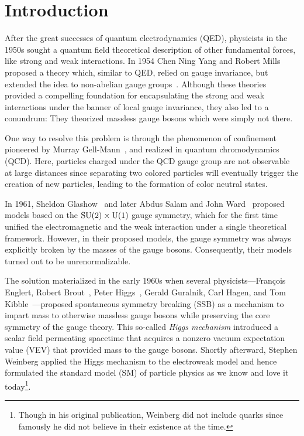 
\chapter{Introduction}\label{chap:one}

After the great successes of quantum electrodynamics (\acs{QED}), physicists in the 1950s sought a quantum field theoretical description of other fundamental forces, like strong and weak interactions. In 1954 Chen Ning Yang and Robert Mills proposed a theory which, similar to \acs{QED}, relied on gauge invariance, but extended the idea to non-abelian gauge groups~\cite{Yang:1954ek}. Although these theories provided a compelling foundation for encapsulating the strong and weak interactions under the banner of local gauge invariance, they also led to a conundrum: They theorized massless gauge bosons which were simply not there.

One way to resolve this problem is through the phenomenon of confinement pioneered by Murray Gell-Mann~\cite{Gell-Mann:1961omu}, and realized in quantum chromodynamics (\acs{QCD}). Here, particles charged under the \acs{QCD} gauge group are not observable at large distances since separating two colored particles will eventually trigger the creation of new particles, leading to the formation of color neutral states.

In 1961, Sheldon Glashow~\cite{Glashow:1961tr} and later Abdus Salam and John Ward~\cite{Salam:1964ry} proposed models based on the $\mathrm{SU}(2)\times \mathrm{U}(1)$ gauge symmetry, which for the first time unified the electromagnetic and the weak interaction under a single theoretical framework. However, in their proposed models, the gauge symmetry was always explicitly broken by the masses of the gauge bosons. Consequently, their models turned out to be unrenormalizable.

The solution materialized in the early 1960s when several physicists---François Englert, Robert Brout~\cite{Englert:1964et}, Peter Higgs~\cite{Higgs:1966ev}, Gerald Guralnik, Carl Hagen, and Tom Kibble~\cite{Guralnik:1964eu}---proposed spontaneous symmetry breaking (\acs{SSB}) as a mechanism to impart mass to otherwise massless gauge bosons while preserving the core symmetry of the gauge theory. This so-called \textit{Higgs mechanism} introduced a scalar field permeating spacetime that acquires a nonzero vacuum expectation value (\acs{VEV}) that provided mass to the gauge bosons. Shortly afterward, Stephen Weinberg applied the Higgs mechanism to the electroweak model and hence formulated the standard model (\acs{SM}) of particle physics as we know and love it today\footnote{Though in his original publication, Weinberg did not include quarks since famously he did not believe in their existence at the time.}.

